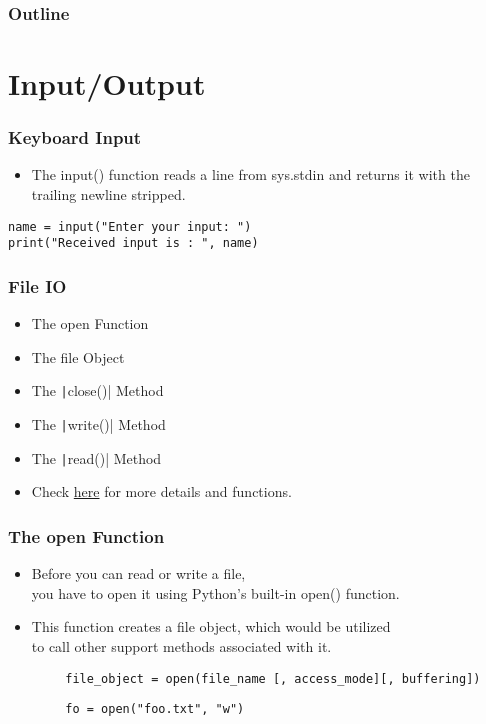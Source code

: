 \documentclass{../py-lecture}
\subtitle{Packages}
\begin{document}
\begin{frame}
  \titlepage{}
\end{frame}
\begin{frame}
  \frametitle{Outline}
  \tableofcontents{}
\end{frame}

\section{Input/Output}

\begin{frame}[fragile]
	\frametitle{Keyboard Input}
    \begin{itemize}
      \item The input() function reads a line from sys.stdin and
        returns it with the trailing newline stripped.
    \end{itemize}
    \begin{verbatim}
name = input("Enter your input: ")
print("Received input is : ", name)
    \end{verbatim}
\end{frame}

\begin{frame}
	\frametitle{File IO}
  \begin{itemize}
    \item The open Function
    \item The file Object
    \item The \texttt|close()| Method
    \item The \texttt|write()| Method
    \item The \texttt|read()| Method
    \item Check
    \href{https://docs.python.org/3/library/functions.html}{here}
    for more details and functions.
  \end{itemize}
\end{frame}

\begin{frame}[fragile]
	\frametitle{The open Function}
  \begin{itemize}
    \item Before you can read or write a file, \\
    you have to open it using Python's built-in open() function.
    \item This function creates a file object, which would be utilized \\
    to call other support methods associated with it.
  \end{itemize}
  \begin{verbatim}
		file_object = open(file_name [, access_mode][, buffering])
	\end{verbatim}
  \begin{verbatim}
		fo = open("foo.txt", "w")
	\end{verbatim}
\end{frame}
\end{document}
